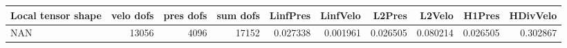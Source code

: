 \begin{tabular}{lrrrrrrrrr}
\toprule
Local tensor shape &  velo dofs &  pres dofs &  sum dofs &  LinfPres &  LinfVelo &   L2Pres &   L2Velo &   H1Pres &  HDivVelo \\
\midrule
               NAN &      13056 &       4096 &     17152 &  0.027338 &  0.001961 & 0.026505 & 0.080214 & 0.026505 &  0.302867 \\
\bottomrule
\end{tabular}

